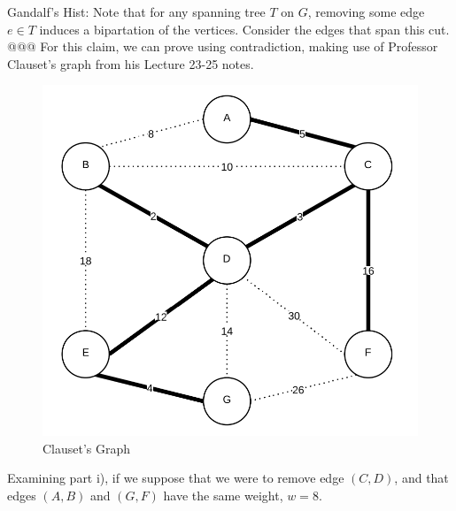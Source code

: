 \documentclass[10pt]{article}\usepackage[]{graphicx}\usepackage[]{xcolor}
\begin{document}
\begin{easylist}[enumerate]
    Gandalf's Hist: Note that for any spanning tree $T$ on $G$, removing some edge $e \in T$ induces a bipartation of
    the vertices. Consider the edges that span this cut.
    @@@ For this claim, we can prove using contradiction, making use of Professor Clauset's graph from his Lecture 23-25
    notes.

    \begin{figure}[H]
        \centering
        \includegraphics[scale=0.5]{./img/ps8/3ca.png}
        \caption{Clauset's Graph}
        \label{fig:3bb}
    \end{figure}

    Examining part i), if we suppose that we were to remove edge $(C, D)$, and that edges $(A, B)$ and $(G, F)$ have the
    same weight, $w=8$.


\end{easylist}
\end{document}
